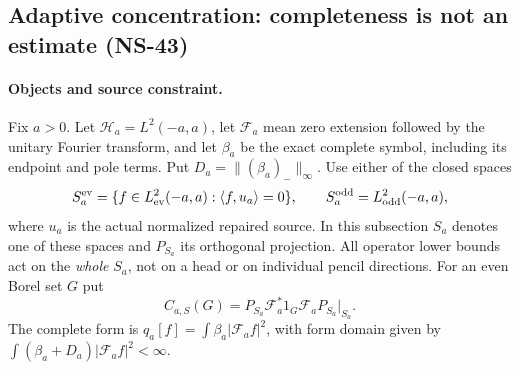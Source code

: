 \subsection*{Adaptive concentration: completeness is not an estimate (NS-43)}
\label{ns43-conc-sec}

\paragraph{Objects and source constraint.}
Fix $a>0$. Let $\mathcal H_a=L^2(-a,a)$, let $\mathcal F_a$ mean
zero extension followed by the unitary Fourier transform, and let
$\beta_a$ be the exact complete symbol, including its endpoint and pole
terms. Put $D_a=\| (\beta_a)_-\|_\infty$.
Use either of the closed spaces
\[
 S_a^{\rm ev}=\{f\in L^2_{\rm ev}(-a,a):\langle f,u_a\rangle=0\},
 \qquad S_a^{\rm odd}=L^2_{\rm odd}(-a,a),
\]
where $u_a$ is the actual normalized repaired source.
In this subsection $S_a$ denotes one of these spaces and $P_{S_a}$
its orthogonal projection. All operator lower bounds act on the
\emph{whole} $S_a$, not on a head or on individual pencil directions.
For an even Borel set $G$ put
\[
 C_{a,S}(G)=P_{S_a}\mathcal F_a^*1_G\mathcal F_aP_{S_a}|_{S_a}.
\]
The complete form is
$q_a[f]=\int\beta_a|\mathcal F_af|^2$, with form domain given by
$\int(\beta_a+D_a)|\mathcal F_af|^2<\infty$.

